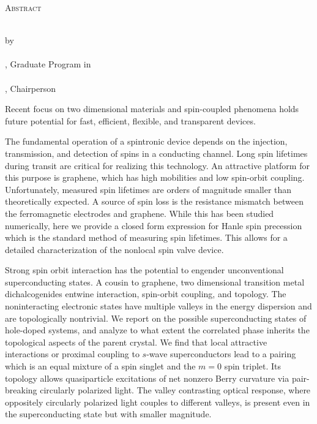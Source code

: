 \clearpage
\centering
\vspace*{-\toptafiddle}

\textsc{Abstract}

\thetitle{} \\
by \\
\theauthor{} \\

\thedegree, Graduate Program in \thefield{} \\
\theuniversity{} \\
\thechair{}, Chairperson \\
\thedate{}

\justify{}
Recent focus on two dimensional materials and spin-coupled phenomena
holds future potential for fast, efficient, flexible, and transparent devices.

The fundamental operation of a spintronic device
depends on the injection, transmission, and detection
of spins in a conducting channel.
Long spin lifetimes during transit are critical for realizing this technology.
An attractive platform for this purpose is graphene, which has high mobilities
and low spin-orbit coupling.
Unfortunately, measured spin lifetimes are orders of magnitude smaller
than theoretically expected.
A source of spin loss is the resistance mismatch between
the ferromagnetic electrodes and graphene.
While this has been studied numerically,
here we provide a closed form expression for Hanle spin precession
which is the standard method of measuring spin lifetimes.
This allows for a detailed characterization of the nonlocal spin valve device.

Strong spin orbit interaction has the potential
to engender unconventional superconducting states.
A cousin to graphene, two dimensional transition metal dichalcogenides
entwine interaction, spin-orbit coupling, and topology.
The noninteracting electronic states have
multiple valleys in the energy dispersion
and are topologically nontrivial.
We report on the possible superconducting states
of hole-doped systems, and analyze to what extent the correlated phase
inherits the topological aspects of the parent crystal.
We find that local attractive interactions or proximal coupling to
$s$-wave superconductors lead to a pairing
which is an equal mixture of a spin singlet and the $m = 0$ spin triplet.
Its topology allows quasiparticle excitations
of net nonzero Berry curvature via pair-breaking circularly polarized light.
The valley contrasting optical response,
where oppositely circularly polarized light couples to different valleys,
is present even in the superconducting state but with smaller magnitude.

\enlargethispage{\bottafiddle}
\clearpage
